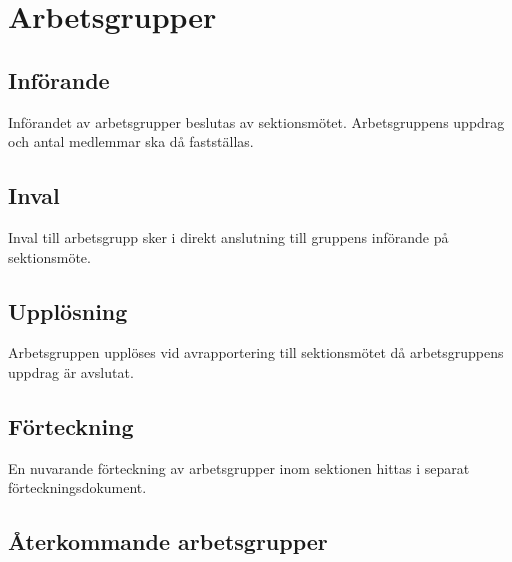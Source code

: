 \section{Arbetsgrupper}

\subsection{Införande}
Införandet av arbetsgrupper beslutas av sektionsmötet. Arbetsgruppens uppdrag och antal medlemmar ska då fastställas.

\subsection{Inval}
Inval till arbetsgrupp sker i direkt anslutning till gruppens införande på sektionsmöte.

\subsection{Upplösning}
Arbetsgruppen upplöses vid avrapportering till sektionsmötet då arbetsgruppens uppdrag är avslutat.

\subsection{Förteckning}
En nuvarande förteckning av arbetsgrupper inom sektionen hittas i separat förteckningsdokument.

\subsection{Återkommande arbetsgrupper}







